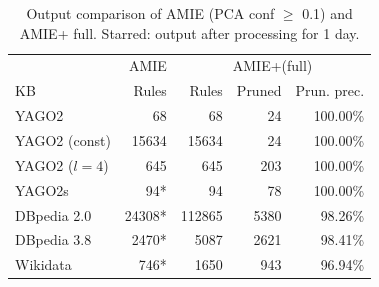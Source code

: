 
\begin{center}
\begin{savenotes}
\begin{table}[t]
\footnotesize
\centering
\begin{tabular}{|l| r |r r r|}
\hline
			& AMIE			& \multicolumn{3}{c|}{AMIE+(full)} 	\\ \cline{2-5}
KB			& Rules 		& Rules		&Pruned	& Prun. prec. 	   \\ \hline
  YAGO2  		& 68			& 68 		&24 	&100.00\%      	    \\ 
  YAGO2 (const)  	& 15634			& 15634		&24	&100.00\% 	    \\  
  YAGO2 ($l=4$)  	& 645			& 645		&203 	&100.00\%   	    \\ 
  YAGO2s  		& 94*			& 94	 	&78 	&100.00\%		    \\
  DBpedia 2.0 		& 24308*		& 112865	&5380 	&98.26\%      	    \\ 
  DBpedia 3.8 		& 2470*			& 5087       	&2621 	&98.41\%	    \\
  Wikidata  		& 746*			& 1650		&943 	&96.94\%      	    \\  \hline
\end{tabular}
\caption{Output comparison of AMIE (PCA conf $\ge$ 0.1) and AMIE+ full. Starred: output after processing for 1 day.}
\label{outputComparison}
\end{table}
\end{savenotes}
\end{center}



